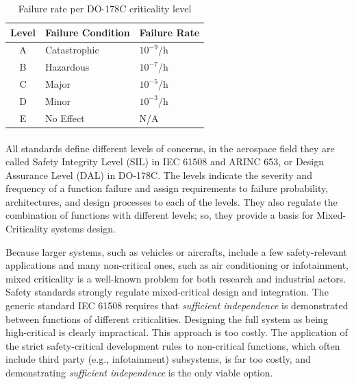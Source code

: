 \begin{table}
\begin{center}
\begin{tabular}{cll}  
\toprule
Level & Failure Condition  & Failure Rate \\
\midrule
A & Catastrophic & $10^{-9}$/h \\
B & Hazardous 	 & $10^{-7}$/h \\
C & Major 		 & $10^{-5}$/h \\
D & Minor 		 & $10^{-3}$/h \\
E & No Effect 	 & N/A \\
\bottomrule
\end{tabular}
\caption {Failure rate per DO-178C criticality level}
\label{tab:DAL}
\end{center}
\end{table}

\paragraph{} All standards define different levels of concerns, in the aerospace field they are called Safety Integrity Level (SIL) in IEC 61508 and ARINC 653, or Design Assurance Level (DAL) in DO-178C. The levels indicate the severity and frequency of a function failure and assign requirements to failure probability, architectures, and design processes to each of the levels. They also regulate the combination of functions with different levels; so, they provide a basis for Mixed-Criticality systems design.
\par Because larger systems, such as vehicles or aircrafts, include a few safety-relevant applications and many non-critical ones, such as air conditioning or infotainment, mixed criticality is a well-known problem for both research and industrial actors. Safety standards strongly regulate mixed-critical design and integration. The generic standard IEC 61508 requires that \emph{sufficient independence} is demonstrated between functions of different criticalities. Designing the full system as being high-critical is clearly impractical. This approach is too costly. The application of the strict safety-critical development rules to non-critical functions, which often include third party (e.g., infotainment) subsystems, is far too costly, and demonstrating \emph{sufficient independence} is the only viable option. 



